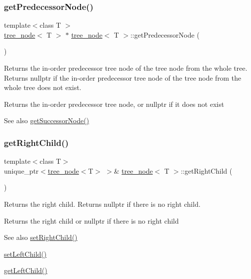 \subsubsection{\texorpdfstring{get\+Predecessor\+Node()}{getPredecessorNode()}}
{\footnotesize\ttfamily template$<$class T $>$ \\
\hyperlink{classtree__node}{tree\+\_\+node}$<$ T $>$ $\ast$ \hyperlink{classtree__node}{tree\+\_\+node}$<$ T $>$\+::get\+Predecessor\+Node (\begin{DoxyParamCaption}{ }\end{DoxyParamCaption})}

Returns the in-\/order predecessor tree node of the tree node from the whole tree. Returns nullptr if the in-\/order predecessor tree node of the tree node from the whole tree does not exist. \begin{DoxyReturn}{Returns}
the in-\/order predecessor tree node, or nullptr if it does not exist 
\end{DoxyReturn}
\begin{DoxySeeAlso}{See also}
\hyperlink{classtree__node_a666b33dc3b2f3e2d2e4815cc4ec8b131}{get\+Successor\+Node()} 
\end{DoxySeeAlso}
\mbox{\label{classtree__node_a5e584d47f2c11941fe0406836fe50159}} 
\subsubsection{\texorpdfstring{get\+Right\+Child()}{getRightChild()}}
{\footnotesize\ttfamily template$<$class T$>$ \\
unique\+\_\+ptr$<$\hyperlink{classtree__node}{tree\+\_\+node}$<$T$>$ $>$\& \hyperlink{classtree__node}{tree\+\_\+node}$<$ T $>$\+::get\+Right\+Child (\begin{DoxyParamCaption}{ }\end{DoxyParamCaption})\hspace{0.3cm}{\ttfamily [inline]}}

Returns the right child. Returns nullptr if there is no right child. \begin{DoxyReturn}{Returns}
the right child or nullptr if there is no right child 
\end{DoxyReturn}
\begin{DoxySeeAlso}{See also}
\hyperlink{classtree__node_afea4c6595dafba65b5c4e59ca3da30f3}{set\+Right\+Child()} 

\hyperlink{classtree__node_a3db979969a0fe8505ba65c7afabb5463}{set\+Left\+Child()} 

\hyperlink{classtree__node_ae161b70a3780e0cb3ecd4b57acc9e2d1}{get\+Left\+Child()} 
\end{DoxySeeAlso}
\mbox{\label{classtree__node_a666b33dc3b2f3e2d2e4815cc4ec8b131}} 
